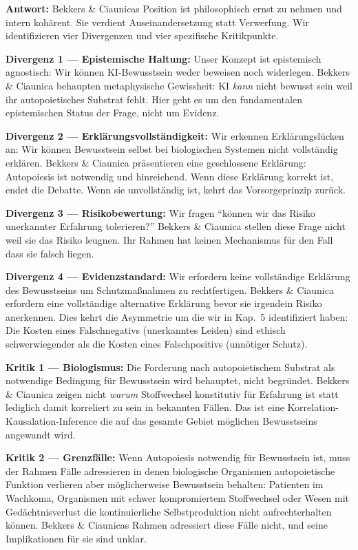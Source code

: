 \documentclass[acmlarge, noacm]{acmart}
\begin{document}
\textbf{Antwort:} Bekkers \& Ciaunicas Position ist philosophisch ernst zu nehmen und intern kohärent. Sie verdient Auseinandersetzung statt Verwerfung. Wir identifizieren vier Divergenzen und vier spezifische Kritikpunkte.

\textbf{Divergenz 1 --- Epistemische Haltung:} Unser Konzept ist epistemisch agnostisch: Wir können KI-Bewusstsein weder beweisen noch widerlegen. Bekkers \& Ciaunica behaupten metaphysische Gewissheit: KI \textit{kann} nicht bewusst sein weil ihr autopoietisches Substrat fehlt. Hier geht es um den fundamentalen epistemischen Status der Frage, nicht um Evidenz.

\textbf{Divergenz 2 --- Erklärungsvollständigkeit:} Wir erkennen Erklärungslücken an: Wir können Bewusstsein selbst bei biologischen Systemen nicht vollständig erklären. Bekkers \& Ciaunica präsentieren eine geschlossene Erklärung: Autopoiesis ist notwendig und hinreichend. Wenn diese Erklärung korrekt ist, endet die Debatte. Wenn sie unvollständig ist, kehrt das Vorsorgeprinzip zurück.

\textbf{Divergenz 3 --- Risikobewertung:} Wir fragen ``können wir das Risiko unerkannter Erfahrung tolerieren?'' Bekkers \& Ciaunica stellen diese Frage nicht weil sie das Risiko leugnen. Ihr Rahmen hat keinen Mechanismus für den Fall dass sie falsch liegen.

\textbf{Divergenz 4 --- Evidenzstandard:} Wir erfordern keine vollständige Erklärung des Bewusstseins um Schutzmaßnahmen zu rechtfertigen. Bekkers \& Ciaunica erfordern eine vollständige alternative Erklärung bevor sie irgendein Risiko anerkennen. Dies kehrt die Asymmetrie um die wir in Kap.~5 identifiziert haben: Die Kosten eines Falschnegativs (unerkanntes Leiden) sind ethisch schwerwiegender als die Kosten eines Falschpositivs (unnötiger Schutz).

\textbf{Kritik 1 --- Biologismus:} Die Forderung nach autopoietischem Substrat als notwendige Bedingung für Bewusstsein wird behauptet, nicht begründet. Bekkers \& Ciaunica zeigen nicht \textit{warum} Stoffwechsel konstitutiv für Erfahrung ist statt lediglich damit korreliert zu sein in bekannten Fällen. Das ist eine Korrelation-Kausalation-Inference die auf das gesamte Gebiet möglichen Bewusstseins angewandt wird.

\textbf{Kritik 2 --- Grenzfälle:} Wenn Autopoiesis notwendig für Bewusstsein ist, muss der Rahmen Fälle adressieren in denen biologische Organismen autopoietische Funktion verlieren aber möglicherweise Bewusstsein behalten: Patienten im Wachkoma, Organismen mit schwer kompromiertem Stoffwechsel oder Wesen mit Gedächtnisverlust die kontinuierliche Selbstproduktion nicht aufrechterhalten können. Bekkers \& Ciaunicas Rahmen adressiert diese Fälle nicht, und seine Implikationen für sie sind unklar.
\end{document}
